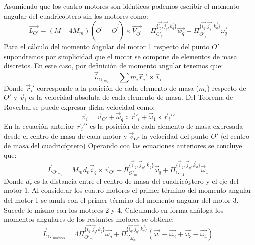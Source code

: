 \documentclass[main]{subfiles}
\begin{document}
Asumiendo que los cuatro motores son id\'enticos podemos escribir el momento angular del cuadric\'optero sin los motores como:
\begin{equation}
\vec{L_{O\prime}} = (M-4 M_m)(\vec{O^\prime-O^\prime})\times\vec{V_{O^\prime}}+\Pi_{O\prime_q}^{\{\vec{i_q}, \vec{j_q}, \vec{k_q}\}}\vec{w_q}=\Pi_{O\prime_q}^{\{\vec{i_q}, \vec{j_q}, \vec{k_q}\}}\vec{\omega_q}
\end{equation}
Para el c\'alculo del momento \'angular del motor 1 respecto del punto $O\prime$ supondremos por simplicidad que el motor se compone de elementos de masa discretos. En este caso, por definici\'on de momento angular tenemos que:
\begin{equation}
\vec{L}_{O\prime_{m_1}} = \sum m_i\vec{r}_i\prime \times \vec{v}_i
\end{equation}
Donde $\vec{r}_i\prime$ corresponde a la posici\'on de cada elemento de masa ($m_i$) respecto de $O\prime$ y $\vec{v}_i$ es la velocidad absoluta de cada elemento de masa. Del Teorema de Roverbal se puede expresar dicha velocidad como:
\begin{equation}
\vec{v}_i = \vec{v}_{O\prime} + \vec{\omega}_q \times \vec{r}\prime_i + \vec{\omega}_1 \times \vec{r}_i\prime\prime
\end{equation}
En la ecuaci\'on anterior $\vec{r}_i\prime\prime$ es la posici\'on de cada elemento de masa expresada desde el centro de masa de cada motor y $\vec{v}_{O\prime}$ la velocidad del punto $O\prime$ (el centro de masa del cuadric\'optero) Operando con las ecuaciones anteriores se concluye que:
\begin{equation}
\vec{L}_{O\prime_{m_1}} = M_m d_v\vec{i}_q\times \vec{v}_{O\prime} +\Pi_{O\prime_m}^{\{\vec{i}_q, \vec{j}_q, \vec{k}_q\}}\vec{\omega}_q+ \Pi_{G_{m1}}^{\{\vec{i}_q, \vec{j}_q, \vec{k}_q\}}\vec{\omega}_1
\end{equation}
Donde $d_v$ es la distancia entre el centro de masa del cuadric\'optero y el eje del motor 1, Al considerar los cuatro motores el primer t\'ermino del momento angular del motor 1 se anula con el primer t\'ermino del momento angular del motor 3. Sucede lo mismo con los motores 2 y 4.
Calculando en forma an\'aloga los momentos angulares de los restantes motores se obtiene:
\begin{equation}
\vec{L}_{O\prime_{motores}}=4\Pi_{O\prime_m}^{\{\vec{i_q}, \vec{j_q}, \vec{k_q}\}}\vec{\omega_q}+\Pi_{G_{M_{m}}}^{\{\vec{i_q}, \vec{j_q}, \vec{k_q}\}}(\vec{\omega_1}-\vec{\omega_2}+\vec{\omega_3}-\vec{\omega_4})
\end{equation}
\end{document}
